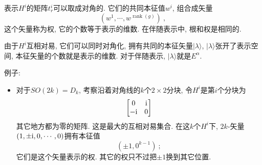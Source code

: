 表示$ H^{i} $的矩阵$ t_{r}^{i} $可以取成对角的. 它们的共同本征值$ w^{i}$, 组合成矢量
\begin{equation}
    (w^{1},\cdots, w^{\operatorname{rank}(g)}) \:, \label{11.4.13}
\end{equation}
这个矢量称为权, 它的个数等于表示的维数. 在伴随表示中, 根和权是相同的.
\begin{tcolorbox}
由于$ H^{i} $互相对易, 它们可以同时对角化, 拥有共同的本征矢量$ \lvert\lambda\rangle$, $\lvert\lambda\rangle $张开了表示空间, 本征矢量的个数就是表示的维数. 对于伴随表示, $\lvert\lambda\rangle $就是$ E^{\alpha}$.
\end{tcolorbox}

\noindent 例子:
\begin{itemize}
    \item 对于$ SO(2k)=D_{k}$, 考察沿着对角线的$ k $个$ 2\times2 $分块, 令$ H^{i} $是第$ i $个分块为
    \begin{equation}
        \begin{bmatrix}
        0 & \mathrm{i} \\ -\mathrm{i} & 0
        \end{bmatrix}  \label{11.4.14}
    \end{equation}
    其它地方都为零的矩阵. 这是最大的互相对易集合. 在这$ k $个$ H^{i} $下, $2k$-矢量$ (1,\pm\mathrm{i},0,\cdots,0) $拥有本征值
    \begin{equation}
    (\pm 1, 0^{k-1}) \:; \label{11.4.15}
    \end{equation}
    它们是这个矢量表示的权. 其它的权只不过把$ \pm1 $换到其它位置.
    

\end{itemize}
